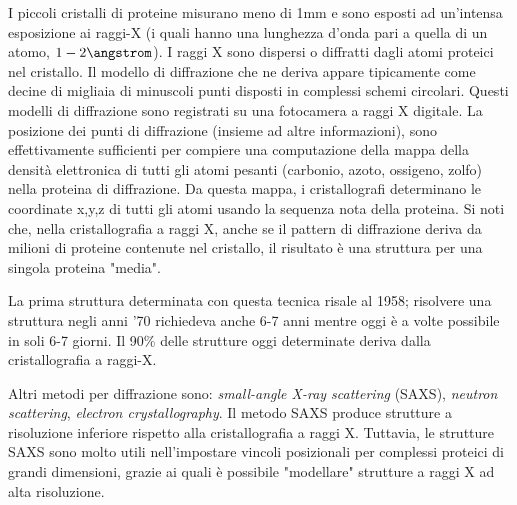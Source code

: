 {\par I piccoli cristalli di proteine misurano meno di 1mm e sono esposti ad un'intensa esposizione ai raggi-X (i quali hanno una lunghezza d'onda pari a quella di un atomo, $1-2\angstrom$). I raggi X sono dispersi o diffratti dagli atomi proteici nel cristallo. Il modello di diffrazione che ne deriva appare tipicamente come decine di migliaia di minuscoli punti disposti in complessi schemi circolari. Questi modelli di diffrazione sono registrati su una fotocamera a raggi X digitale. La posizione dei punti di diffrazione (insieme ad altre informazioni), sono effettivamente sufficienti per compiere una computazione della mappa della densità elettronica di tutti gli atomi pesanti (carbonio, azoto, ossigeno, zolfo) nella proteina di diffrazione. Da questa mappa, i cristallografi determinano le coordinate x,y,z di tutti gli atomi usando la sequenza nota della proteina. Si noti che, nella cristallografia a raggi X, anche se il pattern di diffrazione deriva da milioni di proteine contenute nel cristallo, il risultato è una struttura per una singola proteina "media".

\par La prima struttura determinata con questa tecnica risale al 1958; risolvere una struttura negli anni '70 richiedeva anche 6-7 anni mentre oggi è a volte possibile in soli 6-7 giorni. Il 90\% delle strutture oggi determinate deriva dalla cristallografia a raggi-X\supercite{baxevanis2020bioinformatics}. \\

\par Altri metodi per diffrazione sono:  \textit{small-angle X-ray scattering }(SAXS), \textit{neutron scattering},  \textit{electron crystallography}. Il metodo SAXS produce strutture a risoluzione inferiore rispetto alla cristallografia a raggi X. Tuttavia, le strutture SAXS sono molto utili nell'impostare vincoli posizionali per complessi proteici di grandi dimensioni, grazie ai quali è possibile "modellare" strutture a raggi X ad alta risoluzione.

}
